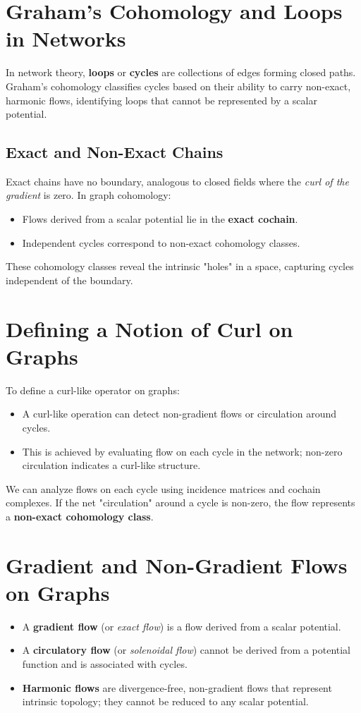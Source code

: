 \documentclass[10pt,a4paper,twocolumn]{article}
\begin{document}
	\section{Graham's Cohomology and Loops in Networks}
	In network theory, \textbf{loops} or \textbf{cycles} are collections of edges forming closed paths. Graham's cohomology classifies cycles based on their ability to carry non-exact, harmonic flows, identifying loops that cannot be represented by a scalar potential.
	
	\subsection{Exact and Non-Exact Chains}
	Exact chains have no boundary, analogous to closed fields where the \textit{curl of the gradient} is zero. In graph cohomology:
	\begin{itemize}
		\item Flows derived from a scalar potential lie in the \textbf{exact cochain}.
		\item Independent cycles correspond to non-exact cohomology classes.
	\end{itemize}
	These cohomology classes reveal the intrinsic "holes" in a space, capturing cycles independent of the boundary.
	
	\section{Defining a Notion of Curl on Graphs}
	To define a curl-like operator on graphs:
	\begin{itemize}
		\item A curl-like operation can detect non-gradient flows or circulation around cycles.
		\item This is achieved by evaluating flow on each cycle in the network; non-zero circulation indicates a curl-like structure.
	\end{itemize}
	
	We can analyze flows on each cycle using incidence matrices and cochain complexes. If the net "circulation" around a cycle is non-zero, the flow represents a \textbf{non-exact cohomology class}.
	
	\section{Gradient and Non-Gradient Flows on Graphs}
	\begin{itemize}
		\item A \textbf{gradient flow} (or \textit{exact flow}) is a flow derived from a scalar potential.
		\item A \textbf{circulatory flow} (or \textit{solenoidal flow}) cannot be derived from a potential function and is associated with cycles.
		\item \textbf{Harmonic flows} are divergence-free, non-gradient flows that represent intrinsic topology; they cannot be reduced to any scalar potential.
	\end{itemize}
	
\end{document}
